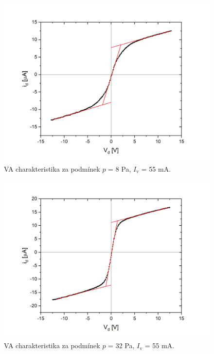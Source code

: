 \documentclass[a4paper,12pt]{article}
\begin{document}
\newpage
\begin{figure}[h!]
	\centering
	\includegraphics[width=130mm]{dvojna1.png}
	\caption{VA charakteristika za podmínek $p$ = 8 \si{\pascal}, $I_\text{{v}}$ = 55 \si{\milli\ampere}.}
	\label{dvojna1}
\end{figure}

\begin{figure}[h!]
	\centering
	\includegraphics[width=130mm]{dvojna2.png}
	\caption{VA charakteristika za podmínek $p$ = 32 \si{\pascal}, $I_\text{{v}}$ = 55 \si{\milli\ampere}.}
	\label{dvojna2}
\end{figure}
\end{document}
